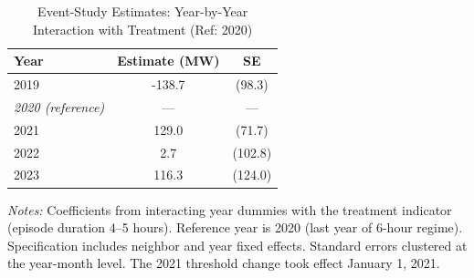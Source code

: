 \begin{table}[H]
\centering
\caption{Event-Study Estimates: Year-by-Year Interaction with Treatment (Ref: 2020)}
\begin{threeparttable}
\begin{tabular}{lcc}
\toprule
Year & Estimate (MW) & SE \\
\midrule
2019 & -138.7 & (98.3) \\
\textit{2020 (reference)} & --- & --- \\
2021 & 129.0 & (71.7) \\
2022 & 2.7 & (102.8) \\
2023 & 116.3 & (124.0) \\
\bottomrule
\end{tabular}
\begin{tablenotes}[flushleft]
\small
\item \textit{Notes:} Coefficients from interacting year dummies with the treatment indicator (episode duration 4--5 hours). Reference year is 2020 (last year of 6-hour regime). Specification includes neighbor and year fixed effects. Standard errors clustered at the year-month level. The 2021 threshold change took effect January 1, 2021.
\end{tablenotes}
\end{threeparttable}
\label{tab:event}
\end{table}
